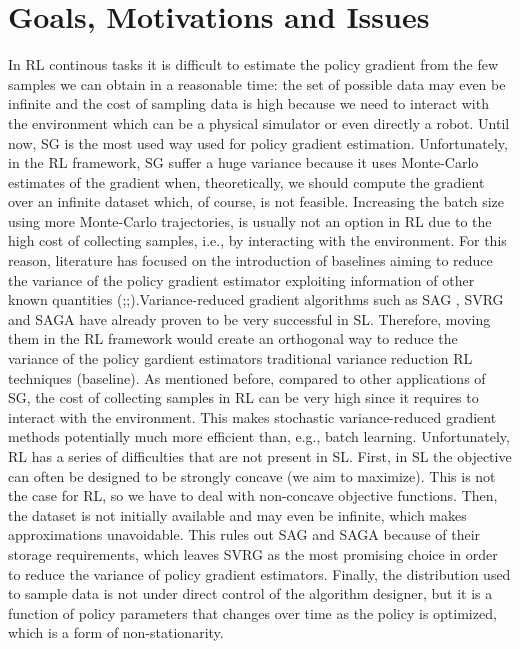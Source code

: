 \section{Goals, Motivations and Issues}
In \acs{RL} continous tasks it is difficult to estimate the policy gradient from the few samples we can obtain in a reasonable time: the set of possible data may even be infinite and the cost of sampling data is high because we need to interact with the environment which can be a physical simulator or even directly a robot.
Until now, \acs{SG} is the most used way used for policy gradient estimation. Unfortunately, in the \acs{RL} framework, \acs{SG} suffer a huge variance because it uses Monte-Carlo estimates of the gradient when, theoretically, we should compute the gradient over an infinite dataset which, of course, is not feasible. Increasing the batch size \ie using more Monte-Carlo trajectories, is usually not an option in \acs{RL} due to the high cost of collecting samples, i.e., by interacting with the environment. For this reason, literature has focused on the introduction of baselines aiming to reduce the variance of the policy gradient estimator exploiting information of other known quantities (\cite{williams1992simple};\cite{peters2008reinforcement};\cite{thomas2017policy}).\newline Variance-reduced gradient algorithms such as \acf{SAG} \citep{roux2012stochastic}, \acf{SVRG} \citep{allen2016variance} and \acf{SAGA} \citep{defazio2014saga} have already proven to be very successful in \acs{SL}. Therefore, moving them in the \acs{RL} framework would create an orthogonal way to reduce the variance of the policy gardient estimators \wrt traditional variance reduction \acs{RL} techniques (\eg baseline).\newline
As mentioned before, compared to other applications of \acs{SG}, the cost of collecting samples in \acs{RL} can be very high since it requires to interact with the environment.
This makes stochastic variance-reduced gradient methods potentially much more efficient than, e.g., batch learning. 
Unfortunately, \acs{RL} has a series of difficulties that are not present in \acs{SL}. First, in \acs{SL} the objective can often be designed to be strongly concave (we aim to maximize). This is not the case for \acs{RL}, so we have to deal with non-concave objective functions. Then, the dataset is not initially available and may even be infinite, which makes approximations unavoidable. This rules out \acs{SAG} and \acs{SAGA} because of their storage requirements, which leaves \acs{SVRG} as the most promising choice in order to reduce the variance of policy gradient estimators.
Finally, the distribution used to sample data is not under direct control of the algorithm designer, but it is a function of policy parameters that changes over time as the policy is optimized, which is a form of non-stationarity.
